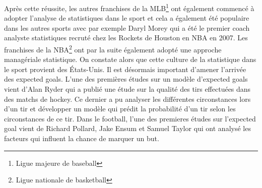 \documentclass[12pt]{article}
\begin{document}
\newline
Après cette réussite, les autres franchises de la MLB\footnote{Ligue majeure de baseball} ont également commencé à adopter l'analyse de statistiques dans le sport et cela a également été populaire dans les autres sports avec par exemple Daryl Morey qui a été le premier coach analyste statistiques recruté chez les Rockets de Houston en NBA en 2007. \cite{DarylMorey13year2020}
Les franchises de la NBA\footnote{Ligue nationale de basketball} ont par la suite également adopté une approche managériale statistique.
On constate alors que cette culture de la statistique dans le sport provient des États-Unis.
\newline
Il est désormais important d'amener l'arrivée des expected goals. L'une des premières études sur un modèle d'expected goals vient d'Alan Ryder qui a publié une étude sur la qualité des tirs effectuées dans des matchs de hockey. \cite{ryderIsolatingShotQuality2004}
Ce dernier a pu analyser les différentes circonstances lors d'un tir et développer un modèle qui prédit la probabilité d'un tir selon les circonstances de ce tir.
Dans le football, l'une des premieres études sur l'expected goal vient de Richard Pollard, Jake Ensum et Samuel Taylor qui ont analysé les facteurs qui influent la chance de marquer un but. \cite{pollardEstimatingProbabilityShot2004}
\end{document}
